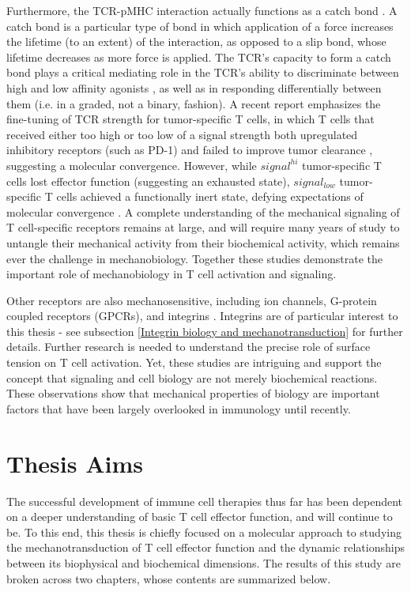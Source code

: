 Furthermore, the TCR-pMHC interaction actually functions as a catch bond \cite{Liu2014}. A catch bond is a particular type of bond in which application of a force increases the lifetime (to an extent) of the interaction, as opposed to a slip bond, whose lifetime decreases as more force is applied. The TCR's capacity to form a catch bond plays a critical mediating role in the TCR's ability to discriminate between high and low affinity agonists \cite{Liu2014}, as well as in responding differentially between them (i.e. in a graded, not a binary, fashion). A recent report emphasizes the fine-tuning of TCR strength for tumor-specific T cells, in which T cells that received either too high or too low of a signal strength both upregulated inhibitory receptors (such as PD-1) and failed to improve tumor clearance \cite{Shakiba2021}, suggesting a molecular convergence. However, while $signal^{hi}$ tumor-specific T cells lost effector function (suggesting an exhausted state), $signal_{low}$ tumor-specific T cells achieved a functionally inert state, defying expectations of molecular convergence \cite{Shakiba2021}. A complete understanding of the mechanical signaling of T cell-specific receptors remains at large, and will require many years of study to untangle their mechanical activity from their biochemical activity, which remains ever the challenge in mechanobiology. Together these studies demonstrate the important role of mechanobiology in T cell activation and signaling.

Other receptors are also mechanosensitive, including ion channels, G-protein coupled receptors (GPCRs), and integrins \cite{Moroni, Iliff2018, Sun2016}. Integrins are of particular interest to this thesis - see subsection \ref{Integrin biology and mechanotransduction} for further details. Further research is needed to understand the precise role of surface tension on T cell activation. Yet, these studies are intriguing and support the concept that signaling and cell biology are not merely biochemical reactions. These observations show that mechanical properties of biology are important factors that have been largely overlooked in immunology until recently. 

\section{Thesis Aims}
The successful development of immune cell therapies thus far has been dependent on a deeper understanding of basic T cell effector function, and will continue to be. To this end, this thesis is chiefly focused on a molecular approach to studying the mechanotransduction of T cell effector function and the dynamic relationships between its biophysical and biochemical dimensions. The results of this study are broken across two chapters, whose contents are summarized below.

